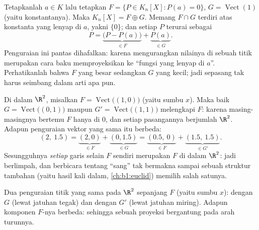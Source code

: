\begin{example}
\label{ex:b1:vspaces:hyperplane}
Tetapkanlah $a \in K$ lalu tetapkan $F = \{P \in K_n[X] : P(a) = 0\}$, $G =
\operatorname{Vect}(1)$ (yaitu konstantanya). Maka $K_n[X] = F \oplus
G$. Memang $F \cap G$ terdiri atas konstanta yang lenyap di $a$,
yakni $\{0\}$; dan setiap $P$ terurai sebagai
\[
P = \underbrace{\bigl(P - P(a)\bigr)}_{\in F}
+ \underbrace{P(a)}_{\in G} .
\]
Penguraian ini pantas dihafalkan: karena mengurangkan nilainya di sebuah
titik merupakan cara baku memproyeksikan ke ``fungsi yang lenyap di
$a$''. Perhatikanlah bahwa $F$  yang besar sedangkan $G$ yang kecil; jadi
sepasang  tak harus seimbang dalam arti apa pun.
\end{example}

\begin{example}
\label{ex:b1:vspaces:manysupplements}
Di dalam $\R^2$, misalkan $F = \operatorname{Vect}\bigl((1,0)\bigr)$ (yaitu
sumbu $x$). Maka baik $G = \operatorname{Vect}\bigl((0,1)\bigr)$ maupun
$G' = \operatorname{Vect}\bigl((1,1)\bigr)$ melengkapi
$F$: karena masing-masingnya bertemu $F$ hanya di $0$, dan setiap pasangannya berjumlah $\R^2$.
Adapun penguraian vektor yang sama itu berbeda:
\[
(2,\ 1.5) = \underbrace{(2, 0)}_{\in F} +
\underbrace{(0, 1.5)}_{\in G}
= \underbrace{(0.5,\ 0)}_{\in F} +
\underbrace{(1.5,\ 1.5)}_{\in G'} .
\]
Sesungguhnya \emph{setiap} garis selain $F$ sendiri merupakan
 $F$ di dalam $\R^2$: jadi  berlimpah,
dan berbicara tentang ``sang''  tak bermakna sampai sebuah
struktur tambahan (yaitu hasil kali dalam, \cref{ch:b1:euclid}) memilih
salah satunya.
\end{example}

\begin{omfigure}

{\small Dua penguraian titik yang sama pada $\R^2$ sepanjang $F$
(yaitu sumbu $x$): dengan  $G$ (lewat jatuhan tegak) dan dengan
 $G'$ (lewat jatuhan miring). Adapun komponen $F$-nya berbeda:
sehingga sebuah proyeksi bergantung pada arah turunnya.}
\end{omfigure}

